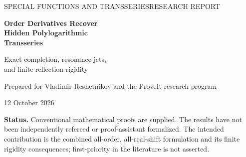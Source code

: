 \documentclass[11pt,a4paper]{article}
\numberwithin{equation}{section}
\theoremstyle{definition}\newtheorem{definition}[theorem]{Definition}
\theoremstyle{remark}\newtheorem{remark}[theorem]{Remark}
\newcommand{\ii}{\mathrm i}\newcommand{\e}{\mathrm e}
\begin{document}
\hypersetup{pageanchor=false}
\begin{titlepage}
\setlength{\parindent}{0pt}
\vspace*{9mm}
{\color{accent}\large SPECIAL FUNCTIONS AND TRANSSERIES\hfill RESEARCH REPORT}\par
\vspace{19mm}
{\color{ink}\fontsize{29}{35}\selectfont\bfseries
Order Derivatives Recover\\[3pt]
Hidden Polylogarithmic\\[3pt]
Transseries}\par
\vspace{10mm}
{\Large Exact completion, resonance jets,\\[3pt]
and finite reflection rigidity}\par
\vspace{12mm}
{\large Prepared for Vladimir Reshetnikov and the ProveIt research program}\par
\vspace{4mm}
{12 October 2026}\par
\vspace{12mm}
\begin{abstract}
We study shifted Lambert--polylogarithm sums
$F_s(t,a)=\sum_{\ell\ge0}\Li_s(\e^{-(\ell+a)t})$.
At each positive integer order $m$, a reflection combination has a finite
algebraic expansion but a generally nonzero, exactly computable
exponential remainder. Its first order derivative restores a divergent
series with double Borel poles. With an explicit Borel normalization, the
Stokes discontinuity of this derivative is exactly $\pi\ii$ times the
hidden remainder. We also identify the derivative itself: its linear
median requires a convergent dual correction with logarithmic divisor
weights. This identification is proved by Mellin inversion, not inferred
from the discontinuity.

For arbitrary finite sets of real shifts, we classify all terminating
integer-order tails and give finite Fourier--M\"obius certificates.
A nonzero reflection-compatible measure on $r$ atoms has a hidden action
among the first $r$ lattice actions; midpoint grids show the bound is
sharp. More generally, the joint kernel of the zeroth and first order
 tails, on finite measures, is precisely the span of Lebesgue measure.
An all-order collision formula shows how reflection removes the explicit
Stieltjes term and lowers the logarithmic degree at every order jet.
Proofs, a source audit, and reproducible exact and numerical checks are
included. Scalar Lambert resurgence and the order-one $q$-product
completion are credited to earlier literature and repository work.
\end{abstract}
\vfill
\noindent\small\textbf{Status.} Conventional mathematical proofs are supplied.
The results have not been independently refereed or proof-assistant
formalized. The intended contribution is the combined all-order,
all-real-shift formulation and its finite rigidity consequences;
first-priority in the literature is not asserted.
\end{titlepage}
\hypersetup{pageanchor=true}\setcounter{page}{1}
\begingroup
\small\setlength{\parskip}{0pt}
\tableofcontents
\endgroup
\newpage
\end{document}
